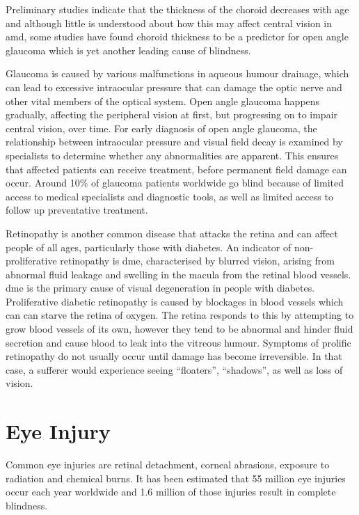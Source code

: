 Preliminary studies indicate that the thickness of the choroid
decreases with age and although little is understood about how
this may affect central vision in \acrshort{amd}, some studies
have found choroid thickness to be a predictor for open angle
glaucoma which is yet another leading cause of
blindness.\cite{margolis2009pilot,gordon2002ocular}

Glaucoma is caused by various malfunctions in aqueous
humour drainage, which can lead to excessive intraocular pressure
that can damage the optic nerve and other vital members of the
optical system.\cite{distelhorst2003open} Open angle glaucoma
happens gradually, affecting the peripheral vision at first, but
progressing on to impair central vision, over time. For early diagnosis
of open angle glaucoma, the relationship between intraocular pressure
and visual field decay is examined by specialists to determine whether
any abnormalities are apparent. This ensures that affected patients
can receive treatment, before permanent field damage can occur.
\cite{goldmann1972open} Around 10\% of glaucoma patients worldwide
go blind because of limited access to medical specialists and diagnostic
tools, as well as limited access to follow up preventative treatment.
\cite{west2000looking}

Retinopathy is another common disease that attacks the retina and
can affect people of all ages, particularly those with diabetes.\cite{klein1984wisconsin}
An indicator of non-proliferative retinopathy is \Gls{dme},
characterised by blurred vision, arising from abnormal fluid leakage
and swelling in the macula from the retinal blood vessels.
\cite{hee1995quantitative} \gls{dme} is the primary cause of
visual degeneration in people with diabetes.\cite{klein1984wisconsin}
Proliferative diabetic retinopathy is caused by blockages in blood vessels
which can can starve the retina of oxygen. The retina responds to this by
attempting to grow blood vessels of its own, however they tend to be
abnormal and hinder fluid secretion and cause blood to leak into the
vitreous humour. Symptoms of prolific retinopathy do not usually occur
until damage has become irreversible. In that case, a sufferer would
experience seeing \enquote{floaters}, \enquote{shadows}, as well as
loss of vision.

\section{Eye Injury}

Common eye injuries are retinal detachment, corneal abrasions, exposure to
radiation and chemical burns. It has been estimated that 55 million eye injuries
occur each year worldwide and 1.6 million of those injuries result in complete
blindness.\cite{negrel1998global}

